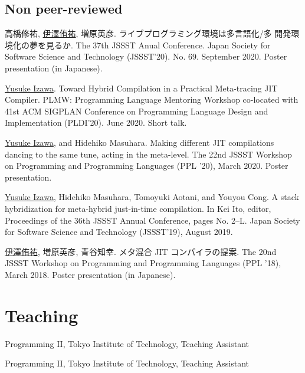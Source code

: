 \documentclass[11pt]{article} %
\newcommand{\YusukeIzawa}{\underline{Yusuke Izawa}}
\newcommand{\伊澤侑祐}{\underline{伊澤侑祐}}
\newcommand{\jit}{\textsc{JIT} }
\begin{document}
\subsection*{Non peer-reviewed}

 高橋修祐, \伊澤侑祐, 増原英彦. ライブプログラミング環境は多言語化/多
開発環境化の夢を見るか. The 37th JSSST Anual Conference. Japan Society for
Software Science and Technology (JSSST'20). No. 69. September 2020. Poster
presentation (in Japanese).
\medskip

 \YusukeIzawa. Toward Hybrid Compilation in a Practical Meta-tracing
\jit Compiler. PLMW: Programming Language Mentoring Workshop co-located with 41st
ACM SIGPLAN Conference on Programming Language Design and Implementation
(PLDI'20). June 2020. Short talk.
\medskip

 \YusukeIzawa, and Hidehiko Masuhara. Making different \jit
compilations dancing to the same tune, acting in the meta-level. The 22nd JSSST
Workshop on Programming and Programming Languages (PPL '20), March 2020. Poster
presentation.
\medskip

 \YusukeIzawa, Hidehiko Masuhara, Tomoyuki Aotani, and Youyou
Cong. A stack hybridization for meta-hybrid just-in-time compilation. In Kei
Ito, editor, Proceedings of the 36th JSSST Annual Conference, pages
No. 2–L. Japan Society for Software Science and Technology (JSSST'19), August
2019.
\medskip


 \伊澤侑祐, 増原英彦, 青谷知幸. メタ混合 \jit コンパイラの提案. The
20nd JSSST Workshop on Programming and Programming Languages (PPL '18), March
2018. Poster presentation (in Japanese).
\medskip


\section*{Teaching}

 Programming II, Tokyo Institute of Technology, Teaching Assistant

 Programming II, Tokyo Institute of Technology, Teaching Assistant
\end{document}
